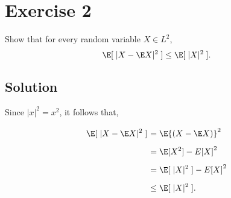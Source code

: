 \section{Exercise 2}
Show that for every random variable $X \in L^2$,
\[ \E[\; |X-\E X|^2 \;]\leq \E [\; |X|^2 \;] . \]

\subsection*{Solution}
Since $|x|^2 = x^2$, it follows that,
\[ \everymath{\displaystyle}
\arraycolsep=1.8pt\def\arraystretch{1.8}
\begin{array}{rl}
    \E[\; |X-\E X|^2 \;] & = \E {(X-\E X)}^2\\
    & = \E[X^2] - E{[X]}^2\\
    & = \E[\; |X|^2 \;] - E{[X]}^2\\
    & \leq \E[\; |X|^2 \;] .
\end{array} \]
%
